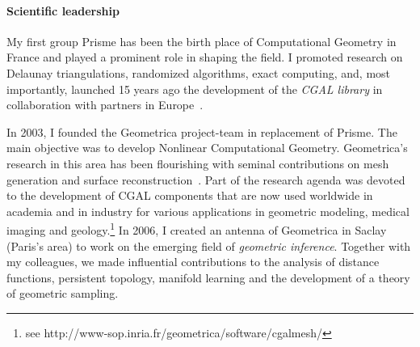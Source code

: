 








\paragraph{Scientific leadership} \mbox{}

My first group Prisme has been the birth place of Computational Geometry in France and played a prominent role in shaping the field. 
I promoted research on Delaunay triangulations, randomized algorithms, exact computing, and, most importantly, launched 15 years ago the development of the {\em CGAL library} in collaboration with partners in Europe~\cite{cgal}.

In 2003, I founded the Geometrica project-team in replacement of Prisme. The main objective was to develop Nonlinear Computational Geometry. 
 Geometrica's research in this area has been flourishing with seminal contributions on mesh generation and surface reconstruction~\cite{geometrica-ecg-book}. Part of the research agenda was devoted to the development of CGAL components that are now used worldwide in academia and in industry for various applications in geometric modeling, medical imaging and geology.\footnote{see http://www-sop.inria.fr/geometrica/software/cgalmesh/}
In 2006, I created an antenna of Geometrica in Saclay (Paris's area)  to work on  the emerging field of {\em geometric inference}.  Together with my colleagues, we made influential contributions to the analysis of distance functions, persistent topology, manifold learning and the development of a theory of geometric sampling.

